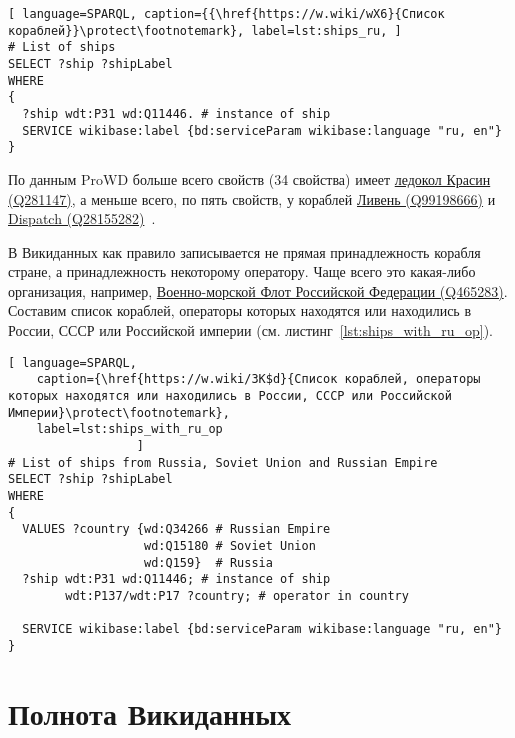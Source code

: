 \begin{lstlisting}[ language=SPARQL, caption={{\href{https://w.wiki/wX6}{Список кораблей}}\protect\footnotemark}, label=lst:ships_ru, ]
# List of ships
SELECT ?ship ?shipLabel
WHERE
{
  ?ship wdt:P31 wd:Q11446. # instance of ship
  SERVICE wikibase:label {bd:serviceParam wikibase:language "ru, en"}
}
\end{lstlisting}

По данным ProWD больше всего свойств (34 свойства) имеет \href{https://www.wikidata.org/wiki/Q281147}{ледокол Красин (Q281147)}, а меньше всего, по пять свойств, у кораблей \href{https://www.wikidata.org/wiki/Q99198666}{Ливень (Q99198666)} и \href{https://www.wikidata.org/wiki/Q28155282}{Dispatch (Q28155282)}~\autocite{ProWD_ru_ships}.

В Викиданных как правило записывается не прямая принадлежность корабля стране, а принадлежность некоторому оператору. Чаще всего это какая-либо организация, например, \href{https://www.wikidata.org/wiki/Q465283}{Военно-морской Флот Российской Федерации (Q465283)}. Составим список кораблей, операторы которых находятся или находились в России, СССР или Российской империи (см. листинг~\ref{lst:ships_with_ru_op}).

\begin{lstlisting}[ language=SPARQL, 
    caption={\href{https://w.wiki/3K$d}{Cписок кораблей, операторы которых находятся или находились в России, СССР или Российской Империи}\protect\footnotemark}, 
    label=lst:ships_with_ru_op 
                  ]
# List of ships from Russia, Soviet Union and Russian Empire
SELECT ?ship ?shipLabel
WHERE
{
  VALUES ?country {wd:Q34266 # Russian Empire
                   wd:Q15180 # Soviet Union
                   wd:Q159}  # Russia
  ?ship wdt:P31 wd:Q11446; # instance of ship
        wdt:P137/wdt:P17 ?country; # operator in country

  SERVICE wikibase:label {bd:serviceParam wikibase:language "ru, en"}
}
\end{lstlisting}


\section{Полнота Викиданных}

